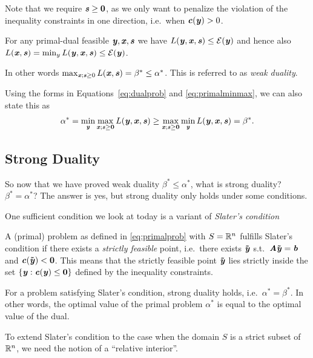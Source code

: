 Note that we require $\boldsymbol{\mathit{s}} \geq \boldsymbol{0}$, as we only want to penalize the violation of the inequality constraints in one direction, i.e.\ when $\boldsymbol{\mathit{c}}(\boldsymbol{\mathit{y}}) > 0$.

For any primal-dual feasible $\boldsymbol{\mathit{y}},\boldsymbol{\mathit{x}},\boldsymbol{\mathit{s}}$ we have
$L(\boldsymbol{\mathit{y}}, \boldsymbol{\mathit{x}}, \boldsymbol{\mathit{s}}) \leq \mathcal{E}(\boldsymbol{\mathit{y}})$ and hence also $L(\boldsymbol{\mathit{x}}, \boldsymbol{\mathit{s}}) = \min_y L(\boldsymbol{\mathit{y}}, \boldsymbol{\mathit{x}}, \boldsymbol{\mathit{s}}) \leq \mathcal{E}(\boldsymbol{\mathit{y}})$.

In other words $\max_{\boldsymbol{\mathit{x}}; \boldsymbol{\mathit{s}} \geq 0} L(\boldsymbol{\mathit{x}}, \boldsymbol{\mathit{s}}) = \beta^* \leq \alpha^*$.
This is referred to as \emph{weak duality}.

Using the forms in Equations~\eqref{eq:dualprob} and
\eqref{eq:primalminmax}, we can also state this as
\begin{equation*}
  \alpha^* = \min_{\boldsymbol{\mathit{y}}}\max_{\boldsymbol{\mathit{x}}; \boldsymbol{\mathit{s}}\geq\boldsymbol{0}} L(\boldsymbol{\mathit{y}}, \boldsymbol{\mathit{x}}, \boldsymbol{\mathit{s}})
  \geq
  \max_{\boldsymbol{\mathit{x}}; \boldsymbol{\mathit{s}}\geq\boldsymbol{0}} \min_{\boldsymbol{\mathit{y}}} L(\boldsymbol{\mathit{y}}, \boldsymbol{\mathit{x}}, \boldsymbol{\mathit{s}})
  =
  \beta^*
  .
\end{equation*}

\subsection{Strong Duality}
So now that we have proved weak duality $\beta^* \leq \alpha^*$,
what is strong duality? $\beta^* = \alpha^*$?
The answer is yes, but strong duality only holds under some conditions.

One sufficient condition we look at today is a variant of \emph{Slater's condition}%

\begin{definition} \label{def:slater}
A (primal) problem as defined in \eqref{eq:primalprob} with $S = \mathbb{R}^n$ fulfills
Slater's condition if there exists a \emph{strictly feasible} point,
i.e.\ there exists $\boldsymbol{\tilde{\mathit{y}}}$ s.t.\ $\boldsymbol{\mathit{A}}\boldsymbol{\tilde{\mathit{y}}} = \boldsymbol{\mathit{b}}$ and $\boldsymbol{\mathit{c}}(\boldsymbol{\tilde{\mathit{y}}}) <
\boldsymbol{0}$.
This means that the strictly feasible point $\boldsymbol{\tilde{\mathit{y}}}$ lies strictly inside the set $\{\boldsymbol{\mathit{y}} : \boldsymbol{\mathit{c}}(\boldsymbol{\mathit{y}}) \leq \boldsymbol{0}\}$ defined by the inequality constraints.
\end{definition}

\begin{theorem}
  \label{thm:slaterstrongduality}
For a problem satisfying Slater's condition, strong duality holds, i.e.\ $\alpha^* = \beta^*$.
In other words, the optimal value of the primal problem $\alpha^*$ is equal to the optimal value of the dual.
\end{theorem}

To extend Slater's condition to the case when the domain $S$ is a
strict subset of $\mathbb{R}^n$, we need the notion of a ``relative interior''.

